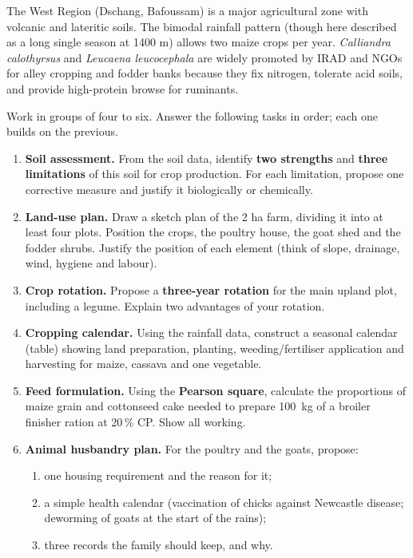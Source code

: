 \documentclass[11pt]{article}
\newcounter{popsec}
\newcounter{popsub}
\newcommand{\courssub}[1]{%
  \stepcounter{popsub}%
  \par\vspace{9pt}\noindent{\popxbold\fontsize{11.5}{13}\selectfont\color{popink}{\color{poporange}\thepopsec.\thepopsub}\hspace{6pt}#1}\par\nopagebreak\vspace{4pt}
}
\begin{document}
\begin{savaistu}
The West Region (Dschang, Bafoussam) is a major agricultural zone with volcanic and lateritic soils. The bimodal rainfall pattern (though here described as a long single season at 1400 m) allows two maize crops per year. \emph{Calliandra calothyrsus} and \emph{Leucaena leucocephala} are widely promoted by IRAD and NGOs for alley cropping and fodder banks because they fix nitrogen, tolerate acid soils, and provide high-protein browse for ruminants.
\end{savaistu}

\courssub{Tasks}

Work in groups of four to six. Answer the following tasks in order; each one builds on the previous.

\begin{enumerate}
\item \textbf{Soil assessment.} From the soil data, identify \textbf{two strengths} and \textbf{three limitations} of this soil for crop production. For each limitation, propose one corrective measure and justify it biologically or chemically.

\item \textbf{Land-use plan.} Draw a sketch plan of the 2 ha farm, dividing it into at least four plots. Position the crops, the poultry house, the goat shed and the fodder shrubs. Justify the position of each element (think of slope, drainage, wind, hygiene and labour).

\item \textbf{Crop rotation.} Propose a \textbf{three-year rotation} for the main upland plot, including a legume. Explain two advantages of your rotation.

\item \textbf{Cropping calendar.} Using the rainfall data, construct a seasonal calendar (table) showing land preparation, planting, weeding/fertiliser application and harvesting for maize, cassava and one vegetable.

\item \textbf{Feed formulation.} Using the \textbf{Pearson square}, calculate the proportions of maize grain and cottonseed cake needed to prepare \SI{100}{kg} of a broiler finisher ration at 20\,\% CP. Show all working.

\item \textbf{Animal husbandry plan.} For the poultry and the goats, propose:
\begin{enumerate}
\item one housing requirement and the reason for it;
\item a simple health calendar (vaccination of chicks against Newcastle disease; deworming of goats at the start of the rains);
\item three records the family should keep, and why.
\end{enumerate}


\end{enumerate}
\end{document}

